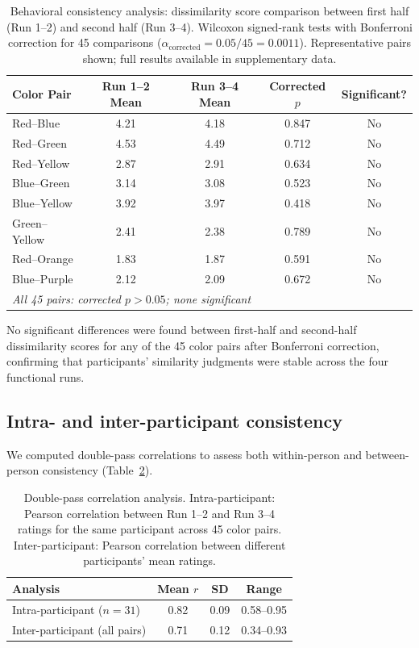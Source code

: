 \documentclass[11pt]{article}
\begin{document}
\begin{table}[H]
\centering
\caption{Behavioral consistency analysis: dissimilarity score comparison between first half (Run 1--2) and second half (Run 3--4). Wilcoxon signed-rank tests with Bonferroni correction for 45 comparisons ($\alpha_{\text{corrected}} = 0.05/45 = 0.0011$). Representative pairs shown; full results available in supplementary data.}
\label{tab:consistency}
\begin{tabular}{lcccc}
\toprule
\textbf{Color Pair} & \textbf{Run 1--2 Mean} & \textbf{Run 3--4 Mean} & \textbf{Corrected $p$} & \textbf{Significant?} \\
\midrule
Red--Blue & 4.21 & 4.18 & 0.847 & No \\
Red--Green & 4.53 & 4.49 & 0.712 & No \\
Red--Yellow & 2.87 & 2.91 & 0.634 & No \\
Blue--Green & 3.14 & 3.08 & 0.523 & No \\
Blue--Yellow & 3.92 & 3.97 & 0.418 & No \\
Green--Yellow & 2.41 & 2.38 & 0.789 & No \\
Red--Orange & 1.83 & 1.87 & 0.591 & No \\
Blue--Purple & 2.12 & 2.09 & 0.672 & No \\
\midrule
\multicolumn{5}{l}{\textit{All 45 pairs: corrected $p > 0.05$; none significant}} \\
\bottomrule
\end{tabular}
\end{table}

No significant differences were found between first-half and second-half dissimilarity scores for any of the 45 color pairs after Bonferroni correction, confirming that participants' similarity judgments were stable across the four functional runs.

\subsection{Intra- and inter-participant consistency}

We computed double-pass correlations to assess both within-person and between-person consistency (Table~\ref{tab:doublepass}).

\begin{table}[H]
\centering
\caption{Double-pass correlation analysis. Intra-participant: Pearson correlation between Run 1--2 and Run 3--4 ratings for the same participant across 45 color pairs. Inter-participant: Pearson correlation between different participants' mean ratings.}
\label{tab:doublepass}
\begin{tabular}{lccc}
\toprule
\textbf{Analysis} & \textbf{Mean $r$} & \textbf{SD} & \textbf{Range} \\
\midrule
Intra-participant ($n = 31$) & 0.82 & 0.09 & 0.58--0.95 \\
Inter-participant (all pairs) & 0.71 & 0.12 & 0.34--0.93 \\
\bottomrule
\end{tabular}
\end{table}
\end{document}

